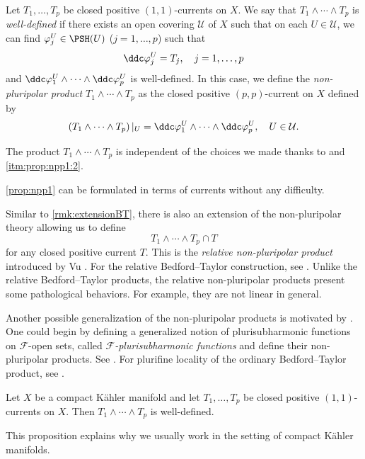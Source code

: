 \begin{definition}\label{def:npp:L146}
Let $T_1,\ldots,T_p$ be closed positive $(1,1)$-currents on $X$. We say that $T_1\wedge\cdots\wedge T_p$ is \emph{well-defined} if there exists an open covering $\mathcal{U}$ of $X$ such that on each $U\in \mathcal{U}$, we can find $\varphi_j^U\in \PSH(U)$ ($j=1,\ldots,p$) such that
\[
\ddc \varphi_j^U=T_j,\quad j=1,\ldots,p
\]
and $\ddc \varphi_1^U\wedge \cdots\wedge \ddc \varphi_p^U$ is well-defined.
In this case, we define the \emph{non-pluripolar product}  $T_1\wedge\cdots\wedge T_p$ as the closed positive $(p,p)$-current on $X$ defined by
\begin{equation}\label{eq:ppp5}
 \left(T_1\wedge\cdots\wedge T_p\right)|_U=\ddc \varphi_1^U\wedge \cdots\wedge \ddc \varphi_p^U,\quad U\in \mathcal{U}.
\end{equation}
\end{definition}
The product $T_1\wedge\cdots\wedge T_p$ is independent of the choices we made thanks to  and \ref{itm:prop:npp1:2}.

\cref{prop:npp1} can be formulated in terms of currents without any difficulty.

\begin{remark}\label{rmk:npp:L161}
    Similar to \cref{rmk:extensionBT}, there is also an extension of the non-pluripolar theory allowing us to define
    \[
    T_1\wedge \cdots \wedge T_p\cap T
    \]
    for any closed positive current $T$. This is the \emph{relative non-pluripolar product} introduced by Vu \cite{Vu20}. For the relative Bedford--Taylor construction, see \cite[Definition~9.1.1]{FPT}. Unlike the relative Bedford--Taylor products, the relative non-pluripolar products present some pathological behaviors. For example, they are not linear in general.
\end{remark}

\begin{remark}\label{rmk:npp:L169}
    Another possible generalization of the non-pluripolar products is motivated by . One could begin by defining a generalized notion of plurisubharmonic functions on $\mathcal{F}$-open sets, called \emph{$\mathcal{F}$-plurisubharmonic functions} and define their non-pluripolar products. See \cite{EKFW11, EKW14}. For plurifine locality of the ordinary Bedford--Taylor product, see \cite[Theorem~10.4.3]{FPT}.
\end{remark}

\begin{proposition}\label{prop:nppwelldef}
    Let $X$ be a compact Kähler manifold and let $T_1,\ldots,T_p$ be closed positive $(1,1)$-currents on $X$. Then $T_1\wedge \cdots\wedge T_p$ is well-defined.
\end{proposition}
This proposition explains why we usually work in the setting of compact Kähler manifolds.

